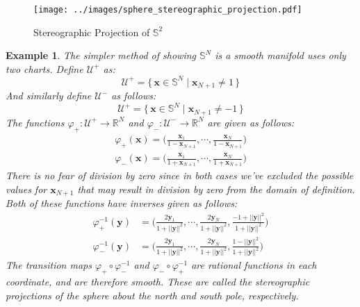 \documentclass{article}
\theoremstyle{plain}
\theoremstyle{normal}
\newtheorem{example}{Example}[section]
\begin{document}
        \begin{figure}
            \centering
            \texttt{[image: ../images/sphere\_stereographic\_projection.pdf]}
            \caption{Stereographic Projection of $\mathbb{S}^{2}$}
            \label{fig:sphere_stereographic_projection}
        \end{figure}
        \begin{example}
            The simpler method of showing $\mathbb{S}^{N}$ is a smooth manifold
            uses only two charts. Define $\mathcal{U}^{+}$ as:
            \begin{equation}
                \mathcal{U}^{+}=
                    \{\,\mathbf{x}\in\mathbb{S}^{N}\;|\;
                        \mathbf{x}_{N+1}\ne{1}\,\}
            \end{equation}
            And similarly define $\mathcal{U}^{-}$ as follows:
            \begin{equation}
                \mathcal{U}^{+}=
                    \{\,\mathbf{x}\in\mathbb{S}^{N}\;|\;
                        \mathbf{x}_{N+1}\ne{-1}\,\}
            \end{equation}
            The functions $\varphi_{+}:\mathcal{U}^{+}\rightarrow\mathbb{R}^{N}$
            and $\varphi_{-}:\mathcal{U}^{-}\rightarrow\mathbb{R}^{N}$ are given
            as follows:
            \begin{align}
                \varphi_{+}(\mathbf{x})=
                    \Big(\frac{\mathbf{x}_{1}}{1-\mathbf{x}_{N+1}},\cdots,
                        \frac{\mathbf{x}_{N}}{1-\mathbf{x}_{N+1}}\Big)\\
                \varphi_{-}(\mathbf{x})=
                    \Big(\frac{\mathbf{x}_{1}}{1+\mathbf{x}_{N+1}},\cdots,
                        \frac{\mathbf{x}_{N}}{1+\mathbf{x}_{N+1}}\Big)
            \end{align}
            There is no fear of division by zero since in both cases we've
            excluded the possible values for $\mathbf{x}_{N+1}$ that may result
            in division by zero from the domain of definition. Both of these
            functions have inverses given as follows:
            \begin{align}
                \varphi_{+}^{-1}(\mathbf{y})&=
                    \Big(\frac{2\mathbf{y}_{1}}{1+||\mathbf{y}||^{2}},\cdots,
                        \frac{2\mathbf{y}_{N}}{1+||\mathbf{y}||^{2}},
                        \frac{-1+||\mathbf{y}||^{2}}{1+||\mathbf{y}||^{2}}
                    \Big)\\
                    \varphi_{-}^{-1}(\mathbf{y})&=
                        \Big(\frac{2\mathbf{y}_{1}}{1+||\mathbf{y}||^{2}},\cdots,
                            \frac{2\mathbf{y}_{N}}{1+||\mathbf{y}||^{2}},
                            \frac{1-||\mathbf{y}||^{2}}{1+||\mathbf{y}||^{2}}
                        \Big)
            \end{align}
            The transition maps $\varphi_{+}\circ\varphi_{-}^{-1}$ and
            $\varphi_{-}\circ\varphi_{+}^{-1}$ are rational functions in each
            coordinate, and are therefore smooth. These are called the
            \textit{stereographic projections} of the sphere about the north
            and south pole, respectively.
        \end{example}
\end{document}
